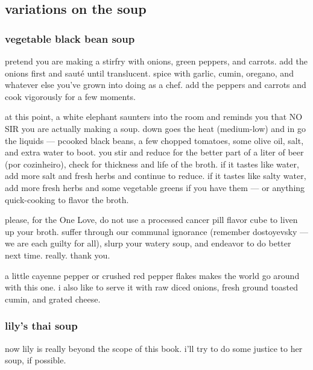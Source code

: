 \subsection{variations on the soup}

\subsubsection{vegetable black bean soup}

pretend you are making a stirfry with onions, green peppers, and
carrots. add the onions first and saut\'{e} until translucent. spice
with garlic, cumin, oregano, and whatever else you've grown into doing
as a chef. add the peppers and carrots and cook vigorously for a few
moments.

at this point, a white elephant saunters into the room and reminds you
that NO SIR you are actually making a soup. down goes the heat
(medium-low) and in go the liquids --- pcooked black beans, a few
chopped tomatoes, some olive oil, salt, and extra water to boot. you
stir and reduce for the better part of a liter of beer (\gls{por
cozinheiro}), check for
thickness and life of the broth. if it tastes like water, add more
salt and fresh herbs and continue to reduce. if it tastes like salty
water, add more fresh herbs and some vegetable greens if you have them
--- or anything quick-cooking to flavor the broth.

please, for the One Love, do not use a processed cancer pill flavor
cube to liven up your broth. suffer through our communal ignorance
(remember dostoyevsky --- we are each guilty for all), slurp your
watery soup, and endeavor to do better next time. really. thank you.

a little cayenne pepper or crushed red pepper flakes makes the world
go around with this one. i also like to serve it with raw diced
onions, fresh ground toasted cumin, and grated cheese.

\subsubsection{lily's thai soup}

now lily is really beyond the scope of this book. i'll try to do some
justice to her soup, if possible.

